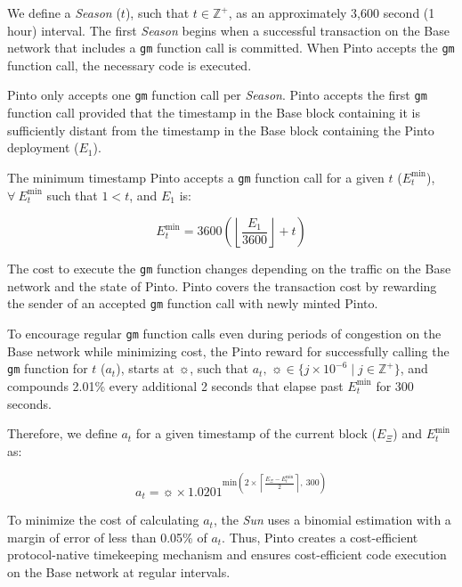\documentclass[tikz]{article}
\newcommand{\code}[1]{\texttt{#1}}
\newcommand{\term}[1]{\textsl{#1}}
\begin{document}
We define a \term{Season} ($t$), such that $t \in \mathbb{Z}^{+}$, as an approximately 3,600 second (1 hour) interval. The first \term{Season} begins when a successful transaction on the Base network that includes a \code{gm} function call is committed. When Pinto accepts the \code{gm} function call, the necessary code is executed.

Pinto only accepts one \code{gm} function call per \term{Season}. Pinto accepts the first \code{gm} function call provided that the timestamp in the Base block containing it is sufficiently distant from the timestamp in the Base block containing the Pinto deployment ($E_{1}$).

The minimum timestamp Pinto accepts a \code{gm} function call for a given $t$ ($E_{t}^{\text{min}}$), $\forall\ E_{t}^{\text{min}}$ such that $1 < t$, and $E_{1}$ is:

    $$
        E_{t}^{\text{min}} = 
            3600{\left
                ({\left\lfloor\frac{E_{1}}{3600}\right\rfloor} + t\right)}
    $$

The cost to execute the \code{gm} function changes depending on the traffic on the Base network and the state of Pinto. Pinto covers the transaction cost by rewarding the sender of an accepted \code{gm} function call with newly minted Pinto. 

To encourage regular \code{gm} function calls even during periods of congestion on the Base network while minimizing cost, the Pinto reward for successfully calling the \code{gm} function for $t$ ($a_{t}$), starts at $\sun$, such that $a_{t},\ \sun \in \{j \times 10^{-6} \mid j \in \mathbb{Z}^{+} \}$, and compounds 2.01\% every additional 2 seconds that elapse past $E_{t}^{\text{min}}$ for 300 seconds.

Therefore, we define $a_{t}$ for a given timestamp of the current block ($E_{\Xi}$) and $E_{t}^{\text{min}}$ as:

    $$ 
        a_{t} = \sun \times 1.0201^{\text{min}(
                    2 \times \left \lceil \frac{E_{\Xi} - E_{t}^{\text{min}}}{2} \right \rceil,\ 
                    300)}
    $$

To minimize the cost of calculating $a_{t}$, the \term{Sun} uses a binomial estimation with a margin of error of less than 0.05\% of $a_{t}$. Thus, Pinto creates a cost-efficient protocol-native timekeeping mechanism and ensures cost-efficient code execution on the Base network at regular intervals.

\end{document}
